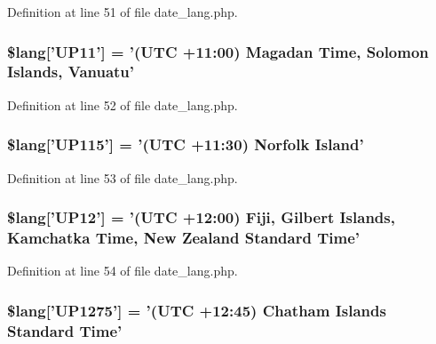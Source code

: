 Definition at line 51 of file date\-\_\-lang.\-php.

\hypertarget{date__lang_8php_a463ad4d63523352c17685f734b4ec7cc}{
\subsubsection[{\$lang}]{\setlength{\rightskip}{0pt plus 5cm}\$lang\mbox{[}'U\-P11'\mbox{]} = '(U\-T\-C +11\-:00) Magadan Time, Solomon Islands, Vanuatu'}}\label{date__lang_8php_a463ad4d63523352c17685f734b4ec7cc}


Definition at line 52 of file date\-\_\-lang.\-php.

\hypertarget{date__lang_8php_a46fa8957c8e606d1641bbcdd75cd2df0}{
\subsubsection[{\$lang}]{\setlength{\rightskip}{0pt plus 5cm}\$lang\mbox{[}'U\-P115'\mbox{]} = '(U\-T\-C +11\-:30) Norfolk Island'}}\label{date__lang_8php_a46fa8957c8e606d1641bbcdd75cd2df0}


Definition at line 53 of file date\-\_\-lang.\-php.

\hypertarget{date__lang_8php_a18a8bb072c3fe7db99091538ce5168be}{
\subsubsection[{\$lang}]{\setlength{\rightskip}{0pt plus 5cm}\$lang\mbox{[}'U\-P12'\mbox{]} = '(U\-T\-C +12\-:00) Fiji, Gilbert Islands, Kamchatka Time, New Zealand Standard Time'}}\label{date__lang_8php_a18a8bb072c3fe7db99091538ce5168be}


Definition at line 54 of file date\-\_\-lang.\-php.

\hypertarget{date__lang_8php_a92e3c23bd9d963bbdfd21e39521bfdc1}{
\subsubsection[{\$lang}]{\setlength{\rightskip}{0pt plus 5cm}\$lang\mbox{[}'U\-P1275'\mbox{]} = '(U\-T\-C +12\-:45) Chatham Islands Standard Time'}}\label{date__lang_8php_a92e3c23bd9d963bbdfd21e39521bfdc1}


